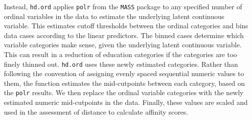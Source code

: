 \documentclass[12pt,econ]{sources/authesis}
\begin{document}
Instead, \texttt{hd.ord} applies \texttt{polr} from the \texttt{MASS} package to any specified number of ordinal variables in the data to estimate the underlying latent continuous variable. This estimates cutoff thresholds between the ordinal categories and bins data cases according to the linear predictors. The binned cases determine which variable categories make sense, given the underlying latent continuous variable. This can result in a reduction of education categories if the categories are too finely thinned out. \texttt{hd.ord} uses these newly estimated categories. Rather than following the convention of assigning evenly spaced sequential numeric values to them, the function estimates the mid-cutpoints between each category, based on the \texttt{polr} results. We then replace the ordinal variable categories with the newly estimated numeric mid-cutpoints in the data. Finally, these values are scaled and used in the assessment of distance to calculate affinity scores.
\end{document}
